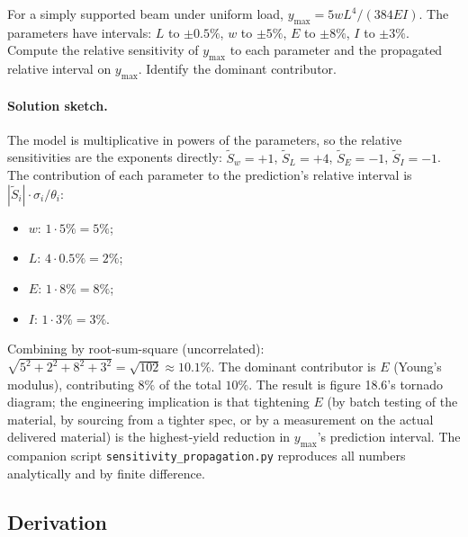 \begin{exercise}
For a simply supported beam under uniform load, $y_{\max} = 5
w L^{4} / (384 E I)$. The parameters have intervals: $L$ to
$\pm 0.5\%$, $w$ to $\pm 5\%$, $E$ to $\pm 8\%$, $I$ to
$\pm 3\%$. Compute the relative sensitivity of $y_{\max}$ to
each parameter and the propagated relative interval on
$y_{\max}$. Identify the dominant contributor.

\paragraph{Solution sketch.} The model is multiplicative in
powers of the parameters, so the relative sensitivities are the
exponents directly: $\tilde S_{w} = +1$, $\tilde S_{L} = +4$,
$\tilde S_{E} = -1$, $\tilde S_{I} = -1$. The contribution of each
parameter to the prediction's relative interval is
$|\tilde S_{i}| \cdot \sigma_{i}/\theta_{i}$:
\begin{itemize}\setlength\itemsep{0pt}
\item $w$: $1 \cdot 5\% = 5\%$;
\item $L$: $4 \cdot 0.5\% = 2\%$;
\item $E$: $1 \cdot 8\% = 8\%$;
\item $I$: $1 \cdot 3\% = 3\%$.
\end{itemize}
Combining by root-sum-square (uncorrelated):
$\sqrt{5^{2} + 2^{2} + 8^{2} + 3^{2}} = \sqrt{102} \approx 10.1\%$.
The dominant contributor is $E$ (Young's modulus), contributing
$8\%$ of the total $10\%$. The result is figure 18.6's tornado
diagram; the engineering implication is that tightening $E$ (by
batch testing of the material, by sourcing from a tighter spec, or
by a measurement on the actual delivered material) is the
highest-yield reduction in $y_{\max}$'s prediction interval. The
companion script \texttt{sensitivity\_propagation.py} reproduces
all numbers analytically and by finite difference.
\end{exercise}

\subsection*{Derivation}

